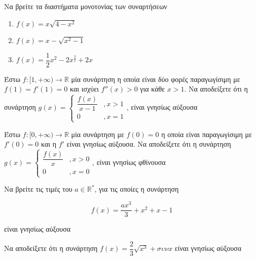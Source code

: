 \documentclass{presentation}
\begin{document}
\begin{askisi}
    Να βρείτε τα διαστήματα μονοτονίας των συναρτήσεων
    \begin{enumerate}
        \item<1-> $f(x)=x\sqrt{4-x^2}$
        \item<2-> $f(x)=x-\sqrt{x^2-1}$
        \item<3-> $f(x)=\dfrac{1}{2}x^2-2x^{\frac{3}{2}}+2x$
    \end{enumerate}

\end{askisi}

\begin{askisi}
    Έστω $f:[1,+\infty)\to\mathbb{R}$ μία συνάρτηση η οποία είναι δύο φορές παραγωγίσιμη με $f(1)=f'(1)=0$ και ισχύει $f''(x)>0$ για κάθε $x>1$. Να αποδείξετε ότι η συνάρτηση $g(x)=\begin{cases}
            \dfrac{f(x)}{x-1} & ,x>1 \\
            0                 & ,x=1
        \end{cases}$, είναι γνησίως αύξουσα

\end{askisi}

\begin{askisi}

    Έστω $f:[0,+\infty)\to\mathbb{R}$ μία συνάρτηση με $f(0)=0$ η οποία είναι παραγωγίσιμη με $f'(0)=0$ και η $f'$ είναι γνησίως αύξουσα. Να αποδείξετε ότι η συνάρτηση $g(x)=\begin{cases}
            \dfrac{f(x)}{x} & ,x>0 \\
            0               & ,x=0
        \end{cases}$, είναι γνησίως φθίνουσα

\end{askisi}

\begin{askisi}
    Να βρείτε τις τιμές του $a\in \mathbb{R}^*$, για τις οποίες η συνάρτηση

    $$f(x)=\dfrac{ax^3}{3}+x^2+x-1$$

    είναι γνησίως αύξουσα

\end{askisi}

\begin{askisi}
    Να αποδείξετε ότι η συνάρτηση $f(x)=\dfrac{2}{3}\sqrt{x^3}+συνx$ είναι γνησίως αύξουσα

\end{askisi}
\end{document}
